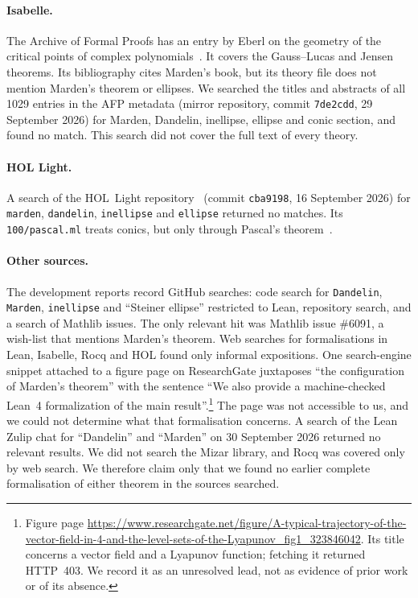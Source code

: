 \documentclass[11pt]{article}
\theoremstyle{remark}
\begin{document}
\paragraph{Isabelle.} The Archive of Formal Proofs has an entry by Eberl on the geometry of the
critical points of complex polynomials~\cite{EberlAFP}. It covers the Gauss--Lucas and Jensen
theorems. Its bibliography cites Marden's book, but its theory file does not mention Marden's theorem or ellipses. We
searched the titles and abstracts of all 1029 entries in the AFP metadata (mirror repository, commit
\texttt{7de2cdd}, 29 September 2026) for Marden, Dandelin, inellipse, ellipse and conic section, and found no
match. This search did not cover the full text of every theory.

\paragraph{HOL Light.} A search of the HOL~Light repository~\cite{HOLLight} (commit
\texttt{cba9198}, 16 September 2026) for \texttt{marden}, \texttt{dandelin}, \texttt{inellipse}
and \texttt{ellipse} returned no matches. Its \texttt{100/pascal.ml} treats conics, but only
through Pascal's theorem~\cite{BaldPascal}.

\paragraph{Other sources.} The development reports record GitHub searches: code search for
\texttt{Dandelin}, \texttt{Marden}, \texttt{inellipse} and ``Steiner ellipse'' restricted to Lean,
repository search, and a search of Mathlib issues. The only relevant hit was Mathlib issue \#6091,
a wish-list that mentions Marden's theorem. Web searches for formalisations in Lean, Isabelle, Rocq
and HOL found only informal expositions. One search-engine snippet attached to a figure page
on ResearchGate juxtaposes ``the configuration of Marden's theorem'' with the sentence ``We also
provide a machine-checked Lean~4 formalization of the main result''.\footnote{Figure page
\url{https://www.researchgate.net/figure/A-typical-trajectory-of-the-vector-field-in-4-and-the-level-sets-of-the-Lyapunov_fig1_323846042}.
Its title concerns a vector field and a Lyapunov function; fetching it returned HTTP~403. We record it as an unresolved lead, not as evidence of prior work or of its absence.}
The page was not accessible to us, and we could not determine what that formalisation concerns.
A search of the Lean Zulip chat for ``Dandelin'' and ``Marden'' on 30 September 2026 returned
no relevant results. We did not search the Mizar library, and Rocq was covered only by web search.
We therefore claim only that we found no earlier complete formalisation of either theorem in the
sources searched.
\end{document}
